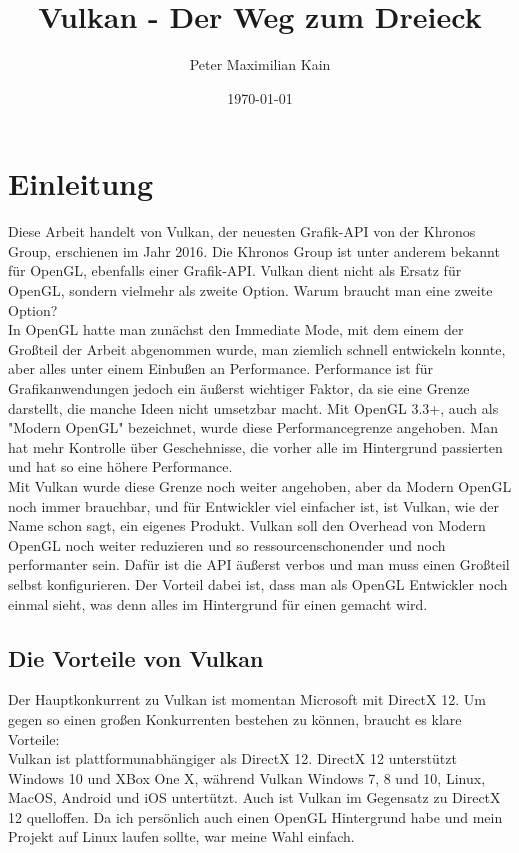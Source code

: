\documentclass[11pt,a4paper]{report}
\title{Vulkan - Der Weg zum Dreieck}
\author{Peter Maximilian Kain}
\date{\today}
\begin{document}
\maketitle
\newpage

\tableofcontents
\newpage

\chapter{Einleitung}
Diese Arbeit handelt von Vulkan, der neuesten Grafik-API von der Khronos Group, erschienen im Jahr 2016. Die Khronos Group ist unter anderem bekannt für OpenGL, ebenfalls einer Grafik-API. Vulkan dient nicht als Ersatz für OpenGL, sondern vielmehr als zweite Option. Warum braucht man eine zweite Option?\\
In OpenGL hatte man zunächst den Immediate Mode, mit dem einem der Großteil der Arbeit abgenommen wurde, man ziemlich schnell entwickeln konnte, aber alles unter einem Einbußen an Performance. Performance ist für Grafikanwendungen jedoch ein äußerst wichtiger Faktor, da sie eine Grenze darstellt, die manche Ideen nicht umsetzbar macht. Mit OpenGL 3.3+, auch als "Modern OpenGL" bezeichnet, wurde diese Performancegrenze angehoben. Man hat mehr Kontrolle über Geschehnisse, die vorher alle im Hintergrund passierten und hat so eine höhere Performance.\\
Mit Vulkan wurde diese Grenze noch weiter angehoben, aber da Modern OpenGL noch immer brauchbar, und für Entwickler viel einfacher ist, ist Vulkan, wie der Name schon sagt, ein eigenes Produkt. Vulkan soll den Overhead von Modern OpenGL noch weiter reduzieren und so ressourcenschonender und noch performanter sein. Dafür ist die API äußerst verbos und man muss einen Großteil selbst konfigurieren. Der Vorteil dabei ist, dass man als OpenGL Entwickler noch einmal sieht, was denn alles im Hintergrund für einen gemacht wird.\\
\newpage

\section{Die Vorteile von Vulkan}
Der Hauptkonkurrent zu Vulkan ist momentan Microsoft mit DirectX 12. Um gegen so einen großen Konkurrenten bestehen zu können, braucht es klare Vorteile:\\
Vulkan ist plattformunabhängiger als DirectX 12. DirectX 12 unterstützt Windows 10 und XBox One X, während Vulkan Windows 7, 8 und 10, Linux, MacOS, Android und iOS untertützt. Auch ist Vulkan im Gegensatz zu DirectX 12 quelloffen. Da ich persönlich auch einen OpenGL Hintergrund habe und mein Projekt auf Linux laufen sollte, war meine Wahl einfach.
\end{document}
